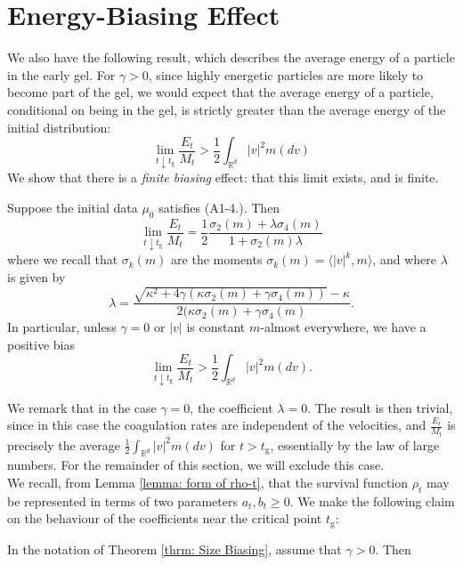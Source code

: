 \section{Energy-Biasing Effect} \label{sec: EB}
We also have the following result, which describes the average energy of a particle in the early gel. For $\gamma >0$, since highly energetic particles are more likely to become part of the gel, we would expect that the average energy of a particle, conditional on being in the gel, is strictly greater than the average energy of the initial distribution: \begin{equation}
    \lim_{t\downarrow t_\mathrm{g}}\frac{E_t}{M_t}>\frac{1}{2}\int_{\mathbb{R}^d}|v|^2m(dv)
\end{equation} We show that there is a \emph{finite biasing} effect: that this limit exists, and is finite. 
\begin{theorem}\label{thrm: Size Biasing} Suppose the initial data $\mu_0$ satisfies ({A1-4}.). Then \begin{equation}
    \lim_{t\downarrow t_\mathrm{g}}\frac{E_t}{M_t}=\frac{1}{2}\frac{\sigma_2(m)+\lambda\sigma_4(m)}{1+\sigma_2(m)\lambda}
\end{equation} where we recall that $\sigma_k(m)$ are the moments $\sigma_k(m)=\langle |v|^k, m\rangle$, and where $\lambda$ is given by \begin{equation} \lambda=\frac{\sqrt{\kappa^2+4\gamma(\kappa\sigma_2(m)+\gamma \sigma_4(m))}-\kappa}{2(\kappa\sigma_2(m)+\gamma\sigma_4(m)}.\end{equation} In particular, unless $\gamma=0$ or $|v|$ is constant $m$-almost everywhere, we have a positive bias \begin{equation}
    \lim_{t\downarrow t_\mathrm{g}}\frac{E_t}{M_t}>\frac{1}{2}\int_{\mathbb{R}^d}|v|^2m(dv).
\end{equation} \end{theorem}  We remark that in the case $\gamma=0$, the coefficient $\lambda=0$. The result is then trivial, since in this case the coagulation rates are independent of the velocities, and $\frac{E_t}{M_t}$ is precisely the average $\frac{1}{2}\int_{\mathbb{R}^d}|v|^2m(dv)$ for $t>t_\mathrm{g}$, essentially by the law of large numbers. For the remainder of this section, we will exclude this case. \medskip \\We recall, from Lemma \ref{lemma: form of rho-t}, that the survival function $\rho_t$ may be represented in terms of two parameters $a_t, b_t \ge 0$. We make the following claim on the behaviour of the coefficients near the critical point $t_\mathrm{g}$: \begin{lemma}\label{lemma: a and b}In the notation of Theorem \ref{thrm: Size Biasing}, assume that $\gamma>0$. Then \begin{enumerate}[label=\roman{*}).]

\end{enumerate}
\end{lemma}
